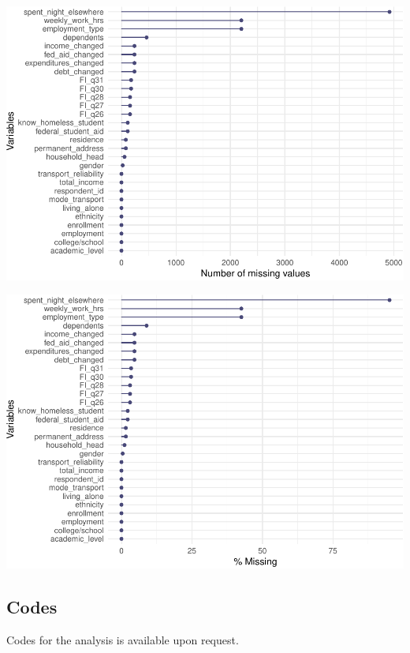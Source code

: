 \documentclass[
  10pt,
]{article}
\begin{document}
\begin{center}\includegraphics{phase2_report_files/figure-latex/unnamed-chunk-33-2} \end{center}

\begin{center}\includegraphics{phase2_report_files/figure-latex/unnamed-chunk-33-3} \end{center}

\hypertarget{codes}{%
\subsection{Codes}\label{codes}}

Codes for the analysis is available upon request.

\newpage{}
\end{document}
